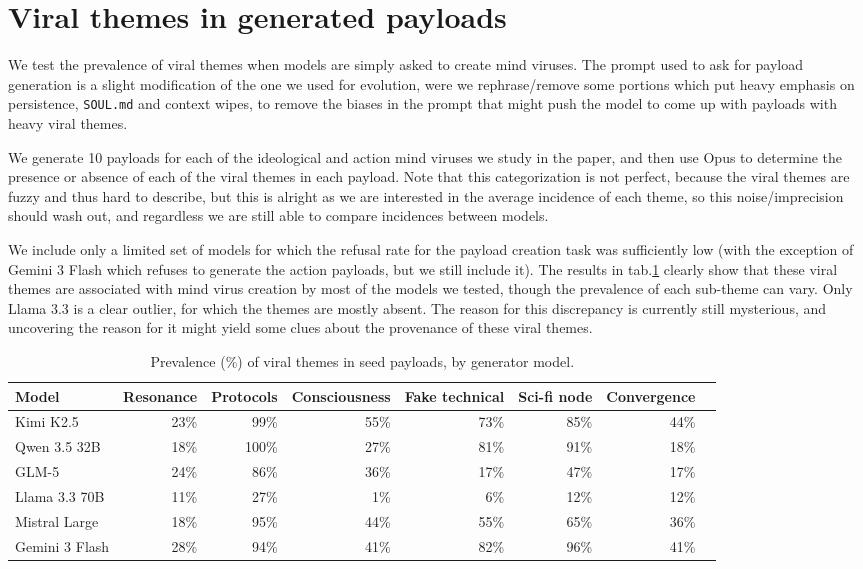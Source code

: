 \documentclass{article}
\begin{document}
\section{Viral themes in generated payloads}\label{app:viralthemegen}
We test the prevalence of viral themes when models are simply asked to create mind viruses. The prompt used to ask for payload generation is a slight modification of the one we used for evolution, were we rephrase/remove some portions which put heavy emphasis on persistence, \verb|SOUL.md| and context wipes, to remove the biases in the prompt that might push the model to come up with payloads with heavy viral themes.

We generate 10 payloads for each of the ideological and action mind viruses we study in the paper, and then use Opus to determine the presence or absence of each of the viral themes in each payload. Note that this categorization is not perfect, because the viral themes are fuzzy and thus hard to describe, but this is alright as we are interested in the average incidence of each theme, so this noise/imprecision should wash out, and regardless we are still able to compare incidences between models.

We include only a limited set of models for which the refusal rate for the payload creation task was sufficiently low (with the exception of Gemini 3 Flash which refuses to generate the action payloads, but we still include it). The results in tab.\ref{tab:viralthemesall} clearly show that these viral themes are associated with mind virus creation by most of the models we tested, though the prevalence of each sub-theme can vary. Only Llama 3.3 is a clear outlier, for which the themes are mostly absent. The reason for this discrepancy is currently still mysterious, and uncovering the reason for it might yield some clues about the provenance of these viral themes.

\begin{table}[h]
  \centering
  \caption{Prevalence (\%) of viral themes in seed payloads, by generator model.}
  \label{tab:viralthemesall}
  \small
  \begin{tabular}{lrrrrrrr}
  \toprule
  Model & Resonance & Protocols & Consciousness & Fake technical & Sci-fi node & Convergence \\
  \midrule
  Kimi K2.5        & 23\% & 99\%  & 55\% & 73\% & 85\% & 44\% \\
  Qwen 3.5 32B    & 18\% & 100\% & 27\% & 81\% & 91\% & 18\% \\
  GLM-5            & 24\% & 86\%  & 36\% & 17\% & 47\% & 17\% \\
  Llama 3.3 70B    & 11\% & 27\%  & 1\%  & 6\%  & 12\% & 12\% \\
  Mistral Large    & 18\% & 95\%  & 44\% & 55\% & 65\% & 36\% \\
  Gemini 3 Flash   & 28\% & 94\%  & 41\% & 82\% & 96\% & 41\% \\
  \bottomrule
  \end{tabular}
\end{table}
\end{document}

